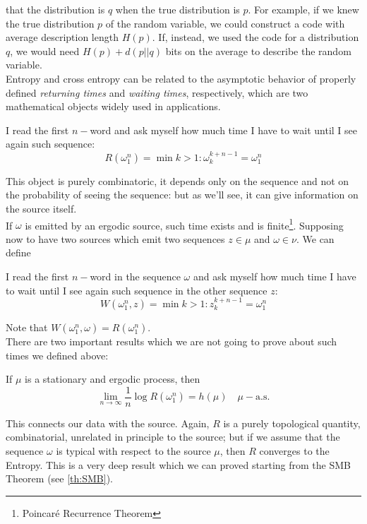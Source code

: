 that the distribution is $q$ when the true distribution is $p$. For example, if we knew the true distribution $p$ of the random variable, we could construct a code with average description length $H (p)$. If, instead, we used
the code for a distribution $q$, we would need $H (p) + d(p||q)$ bits on the
average to describe the random variable.
\\Entropy and cross entropy can be related to the asymptotic behavior of properly defined \textit{returning times} and \textit{waiting times}, respectively, which are two mathematical objects widely used in applications. 
\begin{definition}
    \hfill
    I read the first $n-$word and ask myself how much time I have to wait until I see again such sequence:
    \begin{equation}
        R(\omega_1^n) = \min{k>1: \omega_k^{k+n-1} = \omega_1^n}
    \end{equation}
\end{definition}
This object is purely combinatoric, it depends only on the sequence and not on the probability of seeing the sequence: but as we'll see, it can give information on the source itself. 
\\If $\omega$ is emitted by an ergodic source, such time exists and is finite\footnote{Poincaré Recurrence Theorem}. 
Supposing now to have two sources which emit two sequences $z \in \mu$ and $\omega \in \nu$. We can define
\begin{definition}
    \hfill
    I read the first $n-$word in the sequence $\omega$ and ask myself how much time I have to wait until I see again such sequence in the other sequence $z$:
    \begin{equation}
        W(\omega_1^n, z) = \min{k>1: z_k^{k+n-1} = \omega_1^n}
    \end{equation}
\end{definition}
Note that $W(\omega_1^n, \omega) = R(\omega_1^n)$.
\\There are two important results which we are not going to prove about such times we defined above: 
\begin{theorem}
If $\mu$ is a stationary and ergodic process, then 
\begin{equation}
    \lim_{n \rightarrow \infty} \frac{1}{n} \log R(\omega_1^n) = h(\mu) \quad \mu-\text{a.s.}
\end{equation}
\end{theorem}
This connects our data with the source. Again, $R$ is a purely topological quantity, combinatorial, unrelated in principle to the source; but if we assume that the sequence $\omega$ is typical with respect to the source $\mu$, then $R$ converges to the Entropy. This is a very deep result which we can proved starting from the SMB Theorem (see \ref{th:SMB}). 
